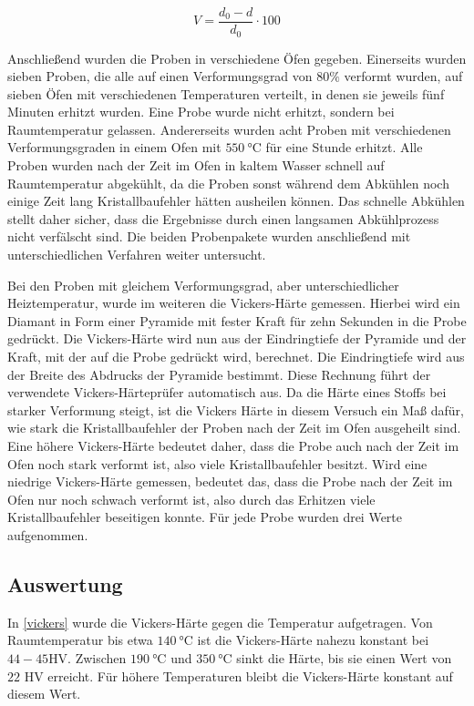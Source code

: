 \documentclass[
	a4paper,
	12pt,
	pagesize,
	ngerman
]{scrartcl}
\begin{document}
\begin{equation}
V = \frac{d_0-d}{d_0} \cdot 100
\label{eq:ver}
\end{equation}

Anschließend wurden die Proben in verschiedene Öfen gegeben. Einerseits wurden sieben Proben, die alle auf einen Verformungsgrad von $80\%$ verformt wurden, auf sieben Öfen mit verschiedenen Temperaturen verteilt, in denen sie jeweils fünf Minuten erhitzt wurden. Eine Probe wurde nicht erhitzt, sondern bei Raumtemperatur gelassen. Andererseits wurden acht Proben mit verschiedenen Verformungsgraden in einem Ofen mit $\SI{550}{\degreeCelsius}$ für eine Stunde erhitzt. Alle Proben wurden nach der Zeit im Ofen in kaltem Wasser schnell auf Raumtemperatur abgekühlt, da die Proben sonst während dem Abkühlen noch einige Zeit lang Kristallbaufehler hätten ausheilen können. Das schnelle Abkühlen stellt daher sicher, dass die Ergebnisse durch einen langsamen Abkühlprozess nicht verfälscht sind. Die beiden Probenpakete wurden anschließend mit unterschiedlichen Verfahren weiter untersucht.

Bei den Proben mit gleichem Verformungsgrad, aber unterschiedlicher Heiztemperatur, wurde im weiteren die Vickers-Härte gemessen. Hierbei wird ein Diamant in Form einer Pyramide mit fester Kraft für zehn Sekunden in die Probe gedrückt. Die Vickers-Härte wird nun aus der Eindringtiefe der Pyramide und der Kraft, mit der auf die Probe gedrückt wird, berechnet. Die Eindringtiefe wird aus der Breite des Abdrucks der Pyramide bestimmt. Diese Rechnung führt der verwendete Vickers-Härteprüfer automatisch aus. Da die Härte eines Stoffs bei starker Verformung steigt, ist die Vickers Härte in diesem Versuch ein Maß dafür, wie stark die Kristallbaufehler der Proben nach der Zeit im Ofen ausgeheilt sind. Eine höhere Vickers-Härte bedeutet daher, dass die Probe auch nach der Zeit im Ofen noch stark verformt ist, also viele Kristallbaufehler besitzt. Wird eine niedrige Vickers-Härte gemessen, bedeutet das, dass die Probe nach der Zeit im Ofen nur noch schwach verformt ist, also durch das Erhitzen viele Kristallbaufehler beseitigen konnte. Für jede Probe wurden drei Werte aufgenommen.

\subsection{Auswertung}

In \cref{vickers} wurde die Vickers-Härte gegen die Temperatur aufgetragen. Von Raumtemperatur bis etwa $\SI{140}{\degreeCelsius}$ ist die Vickers-Härte nahezu konstant bei $44-45$HV. Zwischen $\SI{190}{\degreeCelsius}$ und $\SI{350}{\degreeCelsius}$ sinkt die Härte, bis sie einen Wert von $22$ HV erreicht. Für höhere Temperaturen bleibt die Vickers-Härte konstant auf diesem Wert.
\end{document}
